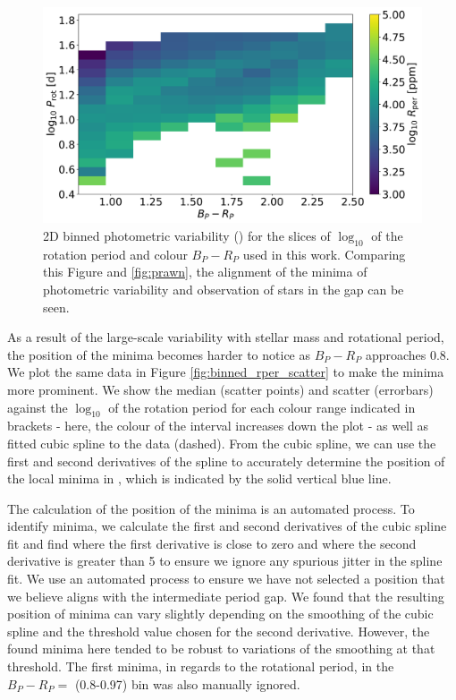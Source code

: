 \begin{figure}
\centering
  \includegraphics[width=\textwidth]{Figures/rot_gap_figures/rot_dist_binned.png}
  \caption[2D binned photometric variability (\rper{}) for the slices of $\log_{10}$ of the rotation period and colour \gaia{} $B_P-R_P$ used in this work.]{
  2D binned photometric variability (\rper{}) for the slices of $\log_{10}$ of the rotation period and colour \gaia{} $B_P-R_P$ used in this work. Comparing this Figure and \ref{fig:prawn}, the alignment of the minima of photometric variability and observation of stars in the gap can be seen.}
  \label{fig:binned_rper_full_sample}
\end{figure}

As a result of the large-scale variability with stellar mass and rotational period, the position of the minima becomes harder to notice as $B_P - R_P$ approaches 0.8.
We plot the same data in Figure \ref{fig:binned_rper_scatter} to make the minima more prominent.
We show the median \rper{} (scatter points) and scatter (errorbars) against the $\log_{10}$ of the rotation period for each colour range indicated in brackets - here, the colour of the interval increases down the plot - as well as fitted cubic spline to the data (dashed).
From the cubic spline, we can use the first and second derivatives of the spline to accurately determine the position of the local minima in \rper{}, which is indicated by the solid vertical blue line.

The calculation of the position of the minima is an automated process.
To identify minima, we calculate the first and second derivatives of the cubic spline fit and find where the first derivative is close to zero and where the second derivative is greater than 5 to ensure we ignore any spurious jitter in the spline fit.
We use an automated process to ensure we have not selected a position that we believe aligns with the intermediate period gap.
We found that the resulting position of minima can vary slightly depending on the smoothing of the cubic spline and the threshold value chosen for the second derivative.
However, the found minima here tended to be robust to variations of the smoothing at that threshold.
The first minima, in regards to the rotational period, in the $B_P-R_P =$ (0.8-0.97) bin was also manually ignored.

